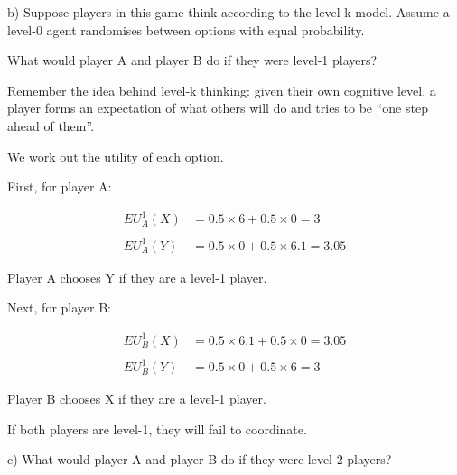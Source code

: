\documentclass[
  letterpaper,
  DIV=11,
  numbers=noendperiod]{scrreprt}
\begin{document}
b) Suppose players in this game think according to the level-k model.
Assume a level-0 agent randomises between options with equal
probability.

What would player A and player B do if they were level-1 players?

\begin{tcolorbox}[enhanced jigsaw, title=\textcolor{quarto-callout-tip-color}{\faLightbulb}\hspace{0.5em}{Answer}, toprule=.15mm, colback=white, breakable, titlerule=0mm, colframe=quarto-callout-tip-color-frame, coltitle=black, opacityback=0, rightrule=.15mm, colbacktitle=quarto-callout-tip-color!10!white, bottomtitle=1mm, opacitybacktitle=0.6, arc=.35mm, bottomrule=.15mm, toptitle=1mm, leftrule=.75mm, left=2mm]

Remember the idea behind level-k thinking: given their own cognitive
level, a player forms an expectation of what others will do and tries to
be ``one step ahead of them''.

We work out the utility of each option.

First, for player A:

\begin{align*}
EU ^{1}_{A}(X)&= 0.5\times 6+0.5\times 0=3 \\
\\
EU ^{1}_{A}(Y)&= 0.5\times 0+0.5\times 6.1=3.05
\end{align*}

Player A chooses Y if they are a level-1 player.

Next, for player B:

\begin{align*}
EU ^{1}_{B}(X)&= 0.5\times 6.1+0.5\times 0=3.05 \\
\\
EU ^{1}_{B}(Y)&= 0.5\times 0+0.5\times 6=3
\end{align*}

Player B chooses X if they are a level-1 player.

If both players are level-1, they will fail to coordinate.

\end{tcolorbox}

c) What would player A and player B do if they were level-2 players?
\end{document}
